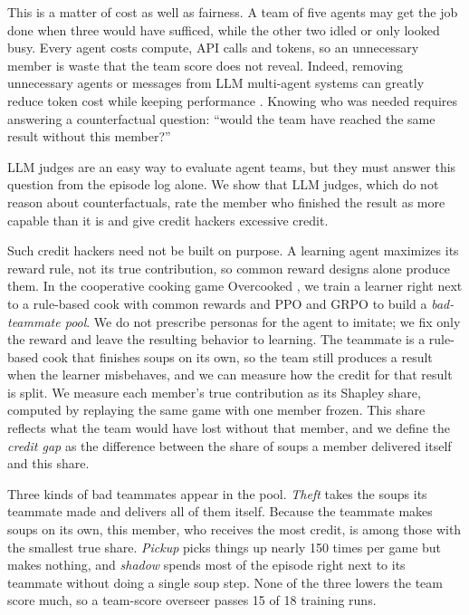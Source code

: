 \documentclass[letterpaper]{article} %
\begin{document}
This is a matter of cost as well as fairness. A team of five agents may get the job done when three
would have sufficed, while the other two idled or only looked busy. Every agent costs compute, API calls
and tokens, so an unnecessary member is waste that the team score does not reveal. Indeed, removing
unnecessary agents or messages from LLM multi-agent systems can greatly reduce token cost while keeping
performance \cite{zhang2025cutthecrap,wang2025agentdropout}. Knowing who was needed requires answering a
counterfactual question: ``would the team have reached the same result without this member?''

LLM judges are an easy way to evaluate agent teams, but they must answer this question from the episode
log alone. We show that LLM judges, which do not reason about counterfactuals, rate the member who
finished the result as more capable than it is and give credit hackers excessive credit.

Such credit hackers need not be built on purpose. A learning agent maximizes its reward rule, not its
true contribution, so common reward designs alone produce them. In the cooperative cooking game
Overcooked \cite{carroll2019utility}, we train a learner right next to a rule-based cook with common
rewards and PPO and GRPO to build a \emph{bad-teammate pool}. We do not prescribe personas for the agent
to imitate; we fix only the reward and leave the resulting behavior to learning. The teammate is a
rule-based cook that finishes soups on its own, so the team still produces a result when the learner
misbehaves, and we can measure how the credit for that result is split. We measure each member's true
contribution as its Shapley share, computed by replaying the same game with one member frozen. This
share reflects what the team would have lost without that member, and we define the \emph{credit gap}
as the difference between the share of soups a member delivered itself and this share.

Three kinds of bad teammates appear in the pool. \emph{Theft} takes the soups its teammate made and
delivers all of them itself. Because the teammate makes soups on its own, this member, who receives the
most credit, is among those with the smallest true share. \emph{Pickup} picks things up nearly 150 times
per game but makes nothing, and \emph{shadow} spends most of the episode right next to its teammate
without doing a single soup step. None of the three lowers the team score much, so a team-score overseer
passes 15 of 18 training runs.
\end{document}
